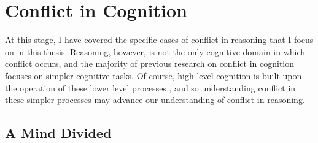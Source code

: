 
\section{Conflict in Cognition}
\label{sec:chapter1-conflict}

At this stage, I have covered
the specific cases  of conflict in reasoning
that I focus on in this thesis.
Reasoning, however, is not the only cognitive domain
in which conflict occurs,
and the majority of previous research on conflict in cognition
focuses on simpler cognitive tasks.
Of course, high-level cognition
is built upon the operation of these lower level processes \citep{Barsalou2007},
and so understanding conflict in these simpler processes
may advance our understanding of conflict in reasoning.


\subsection{A Mind Divided}
\label{subsec:chapter1-conflict-divided}

